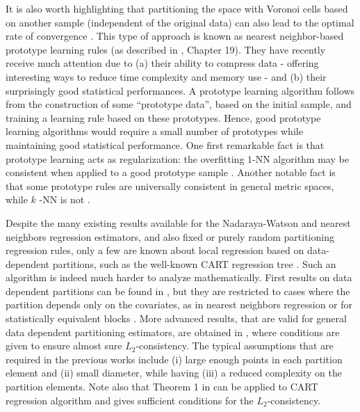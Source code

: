 \documentclass[paper=a4, fontsize=11pt]{scrartcl}
\begin{document}
It is also worth highlighting that partitioning the space with Voronoi cells based on another sample (independent of the original data)  can also lead to the optimal rate of convergence \citep{gyorfi2021universal,kerem2023error}. This type of approach is known as nearest neighbor-based prototype learning rules (as described in \cite{devroye96probabilistic}, Chapter 19). They have recently receive much attention \cite{NIPS2014_8c19f571,NIPS2017_934815ad,hanneke2021universal,gyorfi2021universal,xue2018achieving,kerem2023error} due to (a) their ability to compress data - offering interesting ways to reduce time complexity and memory use - and (b) their surprisingly good statistical performances. A prototype learning algorithm follows from the construction of some ``prototype data'', based on the initial sample, and training a learning rule based on these prototypes. Hence, good prototype learning algorithms would require a small number of prototypes while maintaining good statistical performance. One first remarkable fact is that prototype learning acts as regularization: the overfitting $1$-NN algorithm may be consistent when applied to a good prototype sample \cite{NIPS2017_934815ad,hanneke2021universal,gyorfi2021universal,xue2018achieving,kerem2023error}. Another notable fact is that some prototype rules are universally consistent in general metric spaces, while $k$ -NN is not \cite{NIPS2017_934815ad,hanneke2021universal,gyorfi2021universal}.



%
%
Despite the many existing results available for the Nadaraya-Watson and nearest neighbors regression estimators, and also fixed or purely random partitioning regression rules, only a few are known about local regression based on data-dependent partitions, such as the well-known CART regression tree \cite{breiman1984classification}. Such an algorithm is indeed much harder to analyze mathematically.
First results on data dependent partitions can be found in \cite{stone1977consistent}, but they are restricted to cases where the partition depends only on the covariates, as in nearest neighbors regression or for statistically equivalent blocks \cite{anderson}. 
More advanced results, that are valid for general data dependent partitioning estimators, are obtained in \cite{gordon1980consistent,breiman1984classification,nobel}, where conditions are given to ensure almost sure $L_2$-consistency. The typical assumptions that are required in the previous works include (i) large enough points in each partition element and (ii) small diameter, while having (iii) a reduced complexity on the partition elements. Note also that Theorem 1 in \cite{scornet2015consistency} can be applied to CART regression algorithm and gives sufficient conditions for the $L_2$-consistency. 
\end{document}
